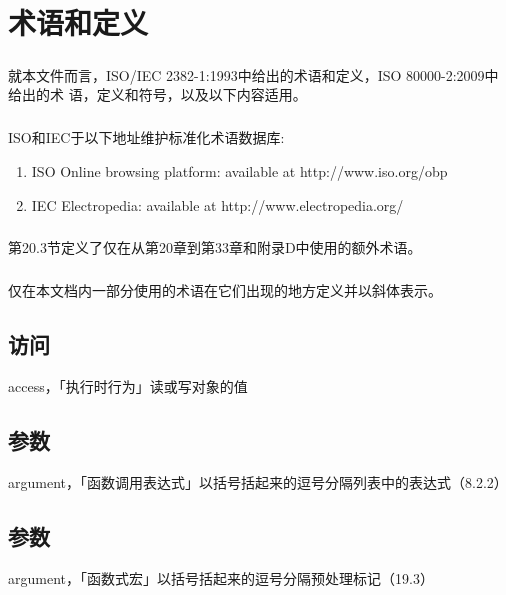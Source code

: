 \chapter{术语和定义}
\paragraph{}
就本文件而言，ISO/IEC 2382-1:1993中给出的术语和定义，ISO 80000-2:2009中给出的术
语，定义和符号，以及以下内容适用。

\paragraph{}
ISO和IEC于以下地址维护标准化术语数据库:
\begin{enumerate}
  \item{ISO Online browsing platform: available at http://www.iso.org/obp}
  \item{IEC Electropedia: available at http://www.electropedia.org/}
\end{enumerate}

\paragraph{}
第20.3节定义了仅在从第20章到第33章和附录D中使用的额外术语。

\paragraph{}
仅在本文档内一部分使用的术语在它们出现的地方定义并以斜体表示。


\section{访问}
\noindent access，「执行时行为」读或写对象的值

\section{参数}
\noindent argument，「函数调用表达式」以括号括起来的逗号分隔列表中的表达式（8.2.2）

\section{参数}
\noindent argument，「函数式宏」以括号括起来的逗号分隔预处理标记（19.3）

